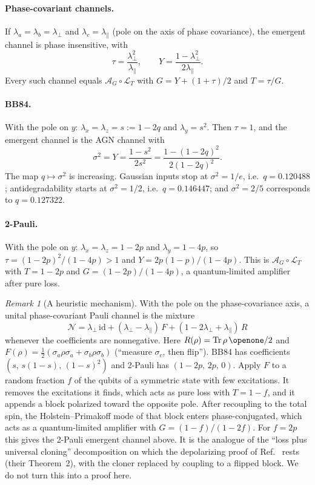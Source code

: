 \documentclass[aps,pra,reprint,superscriptaddress,nofootinbib,longbibliography,floatfix]{revtex4-2}
\theoremstyle{remark}
\newtheorem{remark}{Remark}
\newcommand{\Tr}{\operatorname{Tr}}
\newcommand{\id}{\mathrm{id}}
\newcommand{\one}{\openone}
\newcommand{\lperp}{\lambda_\perp}
\newcommand{\lpar}{\lambda_\parallel}
\newcommand{\Amp}{\mathcal{A}}
\newcommand{\Loss}{\mathcal{L}}
\begin{document}
\paragraph*{Phase-covariant channels.} If $\lambda_a=\lambda_b=\lperp$ and $\lambda_c=\lpar$ (pole on the
axis of phase covariance), the emergent channel is phase insensitive, with
\begin{equation}
  \tau=\frac{\lperp^2}{\lpar},\qquad Y=\frac{1-\lperp^2}{2\lpar}.
  \label{eq:tauY}
\end{equation}
Every such channel equals $\Amp_G\circ\Loss_T$ with $G=Y+(1+\tau)/2$ and $T=\tau/G$.

\paragraph*{BB84.} With the pole on $y$: $\lambda_x=\lambda_z=s:=1-2q$ and $\lambda_y=s^2$. Then
$\tau=1$, and the emergent channel is the AGN channel with
\begin{equation}
  \sigma^2=Y=\frac{1-s^2}{2s^2}=\frac{1-(1-2q)^2}{2(1-2q)^2}.
  \label{eq:sigmaq}
\end{equation}
The map $q\mapsto\sigma^2$ is increasing. Gaussian inputs stop at $\sigma^2=1/e$, i.e.\ $q=0.120488$;
antidegradability starts at $\sigma^2=1/2$, i.e.\ $q=0.146447$; and $\sigma^2=2/5$ corresponds to
$q=0.127322$.

\paragraph*{2-Pauli.} With the pole on $y$: $\lambda_x=\lambda_z=1-2p$ and $\lambda_y=1-4p$, so
$\tau=(1-2p)^2/(1-4p)>1$ and $Y=2p(1-p)/(1-4p)$. This is $\Amp_G\circ\Loss_T$ with $T=1-2p$ and
$G=(1-2p)/(1-4p)$, a quantum-limited amplifier after pure loss.

\begin{remark}[A heuristic mechanism]
\label{rem:mechanism}
With the pole on the phase-covariance axis, a unital phase-covariant Pauli channel is the mixture
\begin{equation}
  \mathcal N=\lperp\,\id+(\lperp-\lpar)\,F+(1-2\lperp+\lpar)\,R
\end{equation}
whenever the coefficients are nonnegative. Here $R(\rho)=\Tr\rho\,\one/2$ and
$F(\rho)=\frac12(\sigma_a\rho\sigma_a+\sigma_b\rho\sigma_b)$ (``measure $\sigma_c$, then flip''). BB84
has coefficients $(s,\,s(1-s),\,(1-s)^2)$ and 2-Pauli has $(1-2p,\,2p,\,0)$. Apply $F$ to a random
fraction $f$ of the qubits of a symmetric state with few excitations. It removes the excitations it
finds, which acts as pure loss with $T=1-f$, and it appends a block polarized toward the opposite pole.
After recoupling to the total spin, the Holstein--Primakoff mode of that block enters phase-conjugated,
which acts as a quantum-limited amplifier with $G=(1-f)/(1-2f)$. For $f=2p$ this gives the 2-Pauli
emergent channel above. It is the analogue of the ``loss plus universal cloning'' decomposition on which
the depolarizing proof of Ref.~\cite{ahmed2026choir} rests (their Theorem~2), with the cloner replaced by
coupling to a flipped block. We do not turn this into a proof here.
\end{remark}
\end{document}
